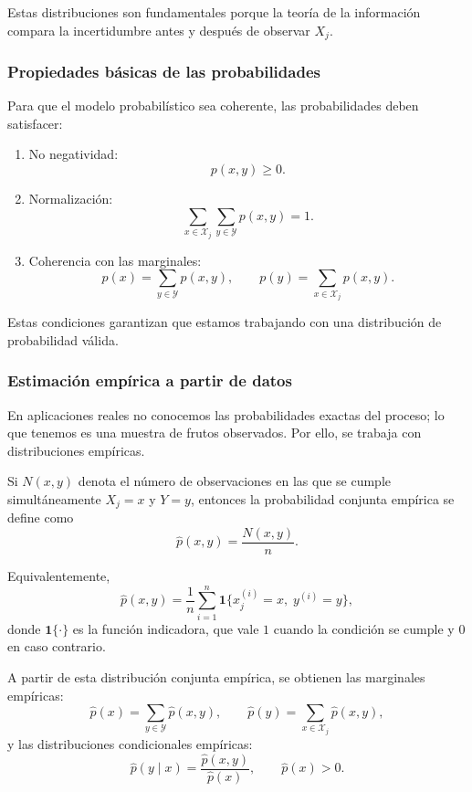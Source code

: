 \documentclass{article}
\begin{document}
Estas distribuciones son fundamentales porque la teoría de la información compara la incertidumbre antes y después de observar \(X_j\).

\subsubsection*{Propiedades básicas de las probabilidades}

Para que el modelo probabilístico sea coherente, las probabilidades deben satisfacer:

\begin{enumerate}
\item No negatividad:
\[
p(x,y)\geq 0.
\]

\item Normalización:
\[
\sum_{x\in\mathcal{X}_j}\sum_{y\in\mathcal{Y}} p(x,y)=1.
\]

\item Coherencia con las marginales:
\[
p(x)=\sum_{y\in\mathcal{Y}} p(x,y), \qquad
p(y)=\sum_{x\in\mathcal{X}_j} p(x,y).
\]
\end{enumerate}

Estas condiciones garantizan que estamos trabajando con una distribución de probabilidad válida.

\subsubsection*{Estimación empírica a partir de datos}

En aplicaciones reales no conocemos las probabilidades exactas del proceso; lo que tenemos es una muestra de frutos observados. Por ello, se trabaja con distribuciones empíricas.

Si \(N(x,y)\) denota el número de observaciones en las que se cumple simultáneamente \(X_j=x\) y \(Y=y\), entonces la probabilidad conjunta empírica se define como
\[
\widehat{p}(x,y)=\frac{N(x,y)}{n}.
\]

Equivalentemente,
\[
\widehat{p}(x,y)=\frac{1}{n}\sum_{i=1}^{n}\mathbf{1}\{x_j^{(i)}=x,\; y^{(i)}=y\},
\]
donde \(\mathbf{1}\{\cdot\}\) es la función indicadora, que vale \(1\) cuando la condición se cumple y \(0\) en caso contrario.

A partir de esta distribución conjunta empírica, se obtienen las marginales empíricas:
\[
\widehat{p}(x)=\sum_{y\in\mathcal{Y}}\widehat{p}(x,y), \qquad
\widehat{p}(y)=\sum_{x\in\mathcal{X}_j}\widehat{p}(x,y),
\]
y las distribuciones condicionales empíricas:
\[
\widehat{p}(y\mid x)=\frac{\widehat{p}(x,y)}{\widehat{p}(x)}, \qquad \widehat{p}(x)>0.
\]
\end{document}
